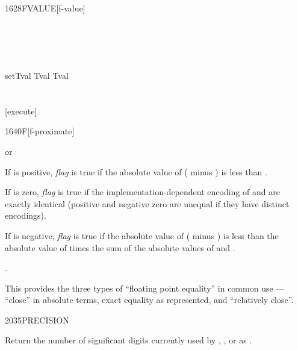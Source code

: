 \begin{worddef}{1628}{FVALUE}[f-value]
	\begin{testing}\ttfamily
		 \\
		 \\
		 \\
		 \\[2ex]
		\word{:} setTval Tval   Tval \word{;} \\
		 \\[2ex]
		 \\
		\word{:} [execute]  \word{;}  \\
		\test[R]{\word{'} Tval \word{]} [execute] \word{[}}{2e0}
	\end{testing}
\end{worddef}


\begin{worddef}[Ftilde]{1640}{F\tilde}[f-proximate]
\item {}  or

	If  is positive, \emph{flag} is true if the absolute
	value of ( minus ) is less than .

	If  is zero, \emph{flag} is true if the
	implementation-dependent encoding of  and 
	are exactly identical (positive and negative zero are unequal if
	they have distinct encodings).

	If  is negative, \emph{flag} is true if the absolute value
	of ( minus ) is less than the absolute value of
	 times the sum of the absolute values of  and
	.

\see {}.

	\begin{rationale} %
		This provides the three types of ``floating point equality''
		in common use --- ``close'' in absolute terms, exact equality
		as represented, and ``relatively close''.
	\end{rationale}
\end{worddef}


\begin{worddef}{2035}{PRECISION}
\item {}

	Return the number of significant digits currently used by
	, , or  as .
\end{worddef}



